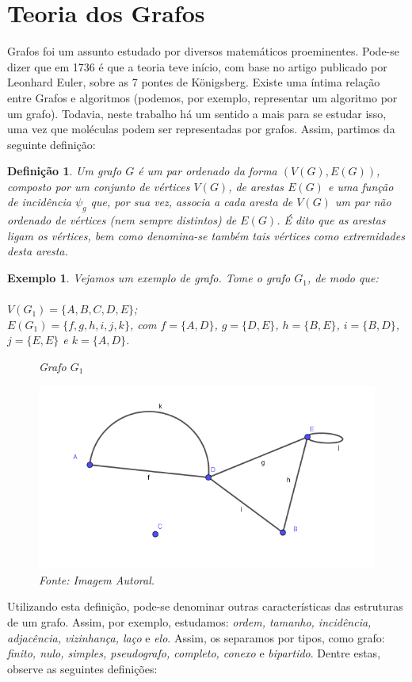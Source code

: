 \documentclass[
	12pt,				%
	openright,			%
	twoside,			%
	a4paper,			%
	english,			%
	french,				%
	spanish,			%
	brazil				%
	]{abntex2}
\newtheorem{exemplo}{Exemplo}[section]
\newtheorem{definicao}{Definição}[section]
\begin{document}
\section{Teoria dos Grafos}

Grafos foi um assunto estudado por diversos matemáticos proeminentes. Pode-se dizer que em 1736 é que a teoria teve início, com base no artigo publicado por Leonhard Euler, sobre as 7 pontes de Königsberg. Existe uma íntima relação entre Grafos e algoritmos (podemos, por exemplo, representar um algoritmo por um grafo). Todavia, neste trabalho há um sentido a mais para se estudar isso, uma vez que moléculas podem ser representadas por grafos. Assim, partimos da seguinte definição:

\begin{definicao}
Um grafo $G$ é um par ordenado da forma $(V(G),E(G))$, composto por um conjunto de \textit{vértices} $V(G)$, de arestas $E(G)$ e uma \textit{função de incidência} $\psi_{g}$ que, por sua vez, associa a cada aresta de $V(G)$ um par não ordenado de vértices (nem sempre distintos) de $E(G)$. É dito que as arestas \textit{ligam} os vértices, bem como denomina-se também tais vértices como \textit{extremidades} desta aresta.
\end{definicao}

\begin{exemplo}
Vejamos um exemplo de grafo. Tome o grafo $G_1$, de modo que:
\\
\\
$V(G_1)=\{A, B, C, D, E\}$;
\\
$E(G_1)=\{f,g,h,i,j,k\}$, com $f=\{A,D\}$, $g=\{D,E\}$, $h=\{B,E\}$, $i=\{B,D\}$, $j=\{E,E\}$ e $k=\{A,D\}$. 
\begin{figure}[h]
 \centering
 \caption{Grafo $G_1$}
  \includegraphics[width=0.55\linewidth]{8.png}
  \caption*{Fonte: Imagem Autoral.}
  \label{}
\end{figure}
\end{exemplo}

Utilizando esta definição, pode-se denominar outras características das estruturas de um grafo. Assim, por exemplo, estudamos: \textit{ordem, tamanho, incidência, adjacência, vizinhança, laço} e \textit{elo}. Assim, os separamos por tipos, como grafo: \textit{finito, nulo, simples, pseudografo, completo, conexo} e \textit{bipartido}. Dentre estas, observe as seguintes definições:
\end{document}
